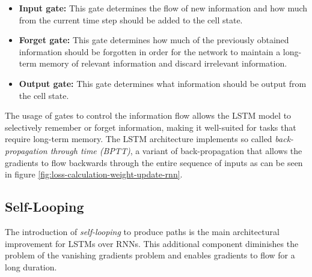             \begin{itemize}
                \item \textbf{Input gate:} This gate determines the flow of new information and how much from the current time step should be added to the cell state.
                \item \textbf{Forget gate:} This gate determines how much of the previously obtained information should be forgotten in order for the network to maintain a long-term memory of relevant information and discard irrelevant information.
                \item \textbf{Output gate:} This gate determines what information should be output from the cell state.
            \end{itemize}
            The usage of gates to control the information flow allows the LSTM model to selectively remember or forget information, making it well-suited for tasks that require long-term memory.
            The LSTM architecture implements so called \emph{back-propagation through time (BPTT)}, a variant of back-propagation that allows the gradients to flow backwards through the entire sequence of inputs as can be seen in figure \ref{fig:loss-calculation-weight-update-rnn}.



        \subsection{Self-Looping}
        \label{sec:self-looping-background}

                    
            The introduction of \emph{self-looping} to produce paths is the main architectural improvement for LSTMs over RNNs. This additional component diminishes the problem of the vanishing gradients problem and enables gradients to flow for a long duration.

